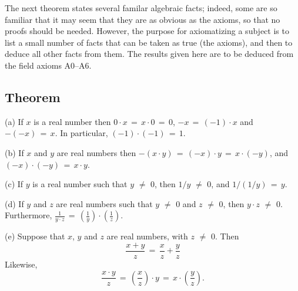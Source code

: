 \V
\V

        The next theorem states several familar algebraic facts; indeed, some are so familiar
    that it may seem that they are as obvious as the axioms, so that no proofs should be needed.
    However, the purpose for axiomatizing a subject is to list a small number of facts that can be taken as true (the axioms), and then to deduce all other facts from them.
    The results given here are to be deduced from the field axioms A0--A6.



            \subsection{\small{\bf Theorem}}
            \label{ThmB10.25}

\V

\hspace*{\parindent}(a) If $x$ is a real number then $0{\cdot}x \,=\, x{\cdot}0 \,=\, 0$, $-x \,=\, (-1){\cdot}x$ and $-(-x) \,=\, x$.
    In particular, $(-1){\cdot}(-1) \,=\, 1$.

\V

        (b) If $x$ and $y$ are real numbers then $-(x{\cdot}y) \,=\, (-x){\cdot}y \,=\, x{\cdot}(-y)$, and $(-x){\cdot}(-y) \,=\, x{\cdot}y$. 

\V

        (c) If $y$ is a real number such that $y \,\,{\neq}\,\, 0$, then $1/y \,\,{\neq}\,\, 0$, and $1/(1/y) \,=\, y$.

\V

        (d) If $y$ and $z$ are real numbers such that $y \,\,{\neq}\,\, 0$ and $z \,\,{\neq}\,\, 0$, then $y{\cdot}z \,\,{\neq}\,\, 0$.
    Furthermore, ${\displaystyle \frac{1}{y{\cdot}z} \,=\, \left(\frac{1}{y}\right){\cdot}\left(\frac{1}{z}\right)}$.


\V

        (e) Suppose that $x$, $y$ and $z$ are real numbers, with $z \,\,{\neq}\,\, 0$.
    Then
        \begin{displaymath}
        \frac{x+y}{z} \,=\, \frac{x}{z} + \frac{y}{z}
        \end{displaymath}
    Likewise,
        \begin{displaymath}
        \frac{x{\cdot}y}{z} \,=\, \left(\frac{x}{z}\right){\cdot}y \,=\, x{\cdot}\left(\frac{y}{z}\right).
        \end{displaymath}

\V

